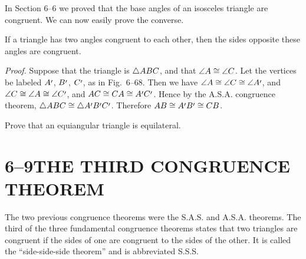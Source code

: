 \documentclass[11pt]{book}
\makeatletter
\newcommand{\VIgp}[2]{%
  \ifvmode\leavevmode\else\par\smallskip\noindent\fi
  \begin{tabular}[t]{@{}l@{\hspace{0.6em}}l@{}}
    Given: & \begin{tabular}[t]{@{}l@{}}#1\end{tabular}\\[2pt]
    Prove: & \begin{tabular}[t]{@{}l@{}}#2\end{tabular}
  \end{tabular}\par\smallskip}
\makeatother
\begin{document}
\begin{exercisecols}
\end{exercisecols}

In Section 6--6 we proved that the base angles of an isosceles triangle are
congruent. We can now easily prove the converse.

\begin{theorem}
If a triangle has two angles congruent to each other, then the sides opposite
these angles are congruent.
\end{theorem}

\emph{Proof.} Suppose that the triangle is $$, and that $\ang{A} \cong
\ang{C}$. Let the vertices be labeled $A\VIpr$, $B\VIpr$, $C\VIpr$, as in
Fig.~6--68. Then we have $\ang{A} \cong \ang{C} \cong \ang{A\VIpr}$, and
$\ang{C} \cong \ang{A} \cong \ang{C\VIpr}$, and $AC \cong CA \cong A\VIpr
C\VIpr$. Hence by the A.S.A. congruence theorem, $ \cong {}$. Therefore $AB \cong A\VIpr B\VIpr \cong CB$.

\FIGVISIXTYEIGHT

Prove that an equiangular triangle is equilateral.

\section*{6--9\quad THE THIRD CONGRUENCE THEOREM}

The two previous congruence theorems were the S.A.S. and A.S.A. theorems. The
third of the three fundamental congruence theorems states that two triangles
are congruent if the sides of one are congruent to the sides of the other. It
is called the ``side-side-side theorem'' and is abbreviated S.S.S.
\end{document}
